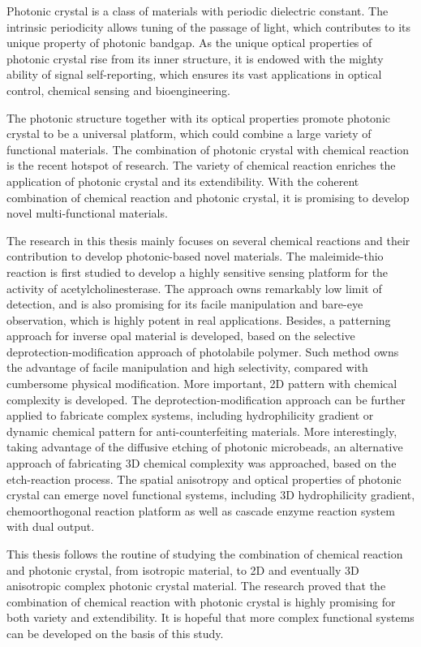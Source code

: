 \begin{eabstract} 
   Photonic crystal is a class of materials with periodic dielectric constant. The intrinsic periodicity allows tuning of the passage of light, which contributes to its unique property of photonic bandgap. As the unique optical properties of photonic crystal rise from its inner structure, it is endowed with the mighty ability of signal self-reporting, which ensures its vast applications in optical control, chemical sensing and bioengineering.

   The photonic structure together with its optical properties promote photonic crystal to be a universal platform, which could combine a large variety of functional materials. The combination of photonic crystal with chemical reaction is the recent hotspot of research. The variety of chemical reaction enriches the application of photonic crystal and its extendibility. With the coherent combination of chemical reaction and photonic crystal, it is promising to develop novel multi-functional materials.

   The research in this thesis mainly focuses on several chemical reactions and their contribution to develop photonic-based novel materials. The maleimide-thio reaction is first studied to develop a highly sensitive sensing platform for the activity of acetylcholinesterase. The approach owns remarkably low limit of detection, and is also promising for its facile manipulation and bare-eye observation, which is highly potent in real applications. Besides, a patterning approach for inverse opal material is developed, based on the selective deprotection-modification approach of photolabile polymer. Such method owns the advantage of facile manipulation and high selectivity, compared with cumbersome physical modification. More important, 2D pattern with chemical complexity is developed. The deprotection-modification approach can be further applied to fabricate complex systems, including hydrophilicity gradient or dynamic chemical pattern for anti-counterfeiting materials. More interestingly, taking advantage of the diffusive etching of photonic microbeads, an alternative approach of fabricating 3D chemical complexity was approached, based on the etch-reaction process. 
   The spatial anisotropy and optical properties of photonic crystal can emerge novel functional systems, including 3D hydrophilicity gradient, chemoorthogonal reaction platform as well as cascade enzyme reaction system with dual output. 

   This thesis follows the routine of studying the combination of chemical reaction and photonic crystal, from isotropic material, to 2D and eventually 3D anisotropic complex photonic crystal material. The research proved that the combination of chemical reaction with photonic crystal is highly promising for both variety and extendibility. It is hopeful that more complex functional systems can be developed on the basis of this study.
\end{eabstract}


